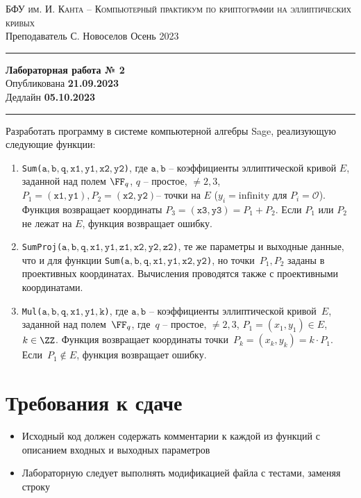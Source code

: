 \documentclass[11pt]{exam}
\theoremstyle{definition}
\begin{document}
	
	{\noindent
		\textsc{БФУ им. И. Канта -- Компьютерный практикум по криптографии на эллиптических кривых }\\[5pt]
		Преподаватель {С. Новоселов}   \hfill{Осень 2023\\}
	\hrule
	\begin{center}
		{\LARGE\textbf{
				Лабораторная работа № 2 \\[5pt]
		}} 
			Опубликована \textbf{21.09.2023} \\[5pt] 
			Дедлайн \textbf{05.10.2023}
		
	\end{center}
	\hrule \vspace{5mm}
	
	\thispagestyle{empty}
	
	Разработать программу в системе компьютерной алгебры Sage, реализующую следующие функции:
	
	\begin{enumerate}
		\item \texttt{Sum($\mathtt{a, b, q,  x1, y1, x2, y2}$)}, где $\mathtt{a, b}$ -- коэффициенты эллиптической кривой $E$, заданной над полем $\FF_q$, $q$ -- простое, $\neq 2,3$, $P_1 = \mathtt{(x1, y1)}, P_2 = \mathtt{(x2, y2)}$-- точки на $E$ ($y_i  = \text{infinity}$ для $P_i = \mathcal{O}$). Функция возвращает координаты $P_3 = \mathtt{(x3, y3)}= P_1 + P_2$. Если $P_1$ или $P_2$ не лежат на $E$, функция возвращает ошибку.
		
		\item \texttt{SumProj($\mathtt{a, b, q,  x1, y1, z1, x2, y2, z2}$)}, те же параметры и выходные данные, что и для функции \texttt{Sum($\mathtt{a, b, q,  x1, y1, x2, y2}$)}, но точки~$P_1, P_2 $ заданы в проективных координатах. Вычисления проводятся  также с проективными координатами.
		
		\item \texttt{Mul($\mathtt{a, b, q,  x1, y1, k}$)}, где $\mathtt{a, b}$ -- коэффициенты эллиптической кривой~$E$, заданной над полем~$\FF_q$, где~$q$ -- простое, $\neq 2,3$, $P_1 = (x_1, y_1) \in E$, $k \in \ZZ$. Функция возвращает координаты точки~$P_k = (x_k, y_k) = k \cdot P_1$. Если~$P_1 \notin E$, функция возвращает ошибку.
	\end{enumerate}

\section*{Требования к сдаче}
    \begin{itemize}
        \item Исходный код должен содержать комментарии к каждой из функций с описанием входных и выходных параметров
        \item Лабораторную следует выполнять модификацией файла с тестами, заменяя строку
        

\end{itemize}}
\end{document}
